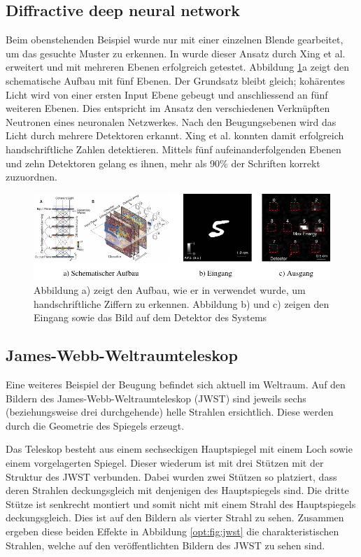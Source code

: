 \subsection{Diffractive deep neural network}
Beim obenstehenden Beispiel wurde nur mit einer einzelnen Blende gearbeitet, um das gesuchte Muster zu erkennen.
In \cite{opt:Lin.2018} wurde dieser Ansatz durch Xing et al. erweitert und mit mehreren Ebenen erfolgreich getestet.
Abbildung \ref{opt:fig:handwriting}a zeigt den schematische Aufbau mit fünf Ebenen.
Der Grundsatz bleibt gleich; kohärentes Licht wird von einer ersten Input Ebene gebeugt und anschliessend an fünf weiteren Ebenen.
Dies entspricht im Ansatz den verschiedenen Verknüpften Neutronen eines neuronalen Netzwerkes.
Nach den Beugungsebenen wird das Licht durch mehrere Detektoren erkannt.
Xing et al. konnten damit erfolgreich handschriftliche Zahlen detektieren.
Mittels fünf aufeinanderfolgenden Ebenen und zehn Detektoren gelang es ihnen, mehr als 90\% der Schriften korrekt zuzuordnen.

\begin{figure}
    \centering
    \includegraphics[width=\textwidth]{papers/opt/images/handwriting.pdf}
    \caption{Abbildung a) zeigt den Aufbau, wie er in \cite{opt:Lin.2018} verwendet wurde, um handschriftliche Ziffern zu erkennen.
    Abbildung b) und c) zeigen den Eingang sowie das Bild auf dem Detektor des Systems}
    \label{opt:fig:handwriting}
\end{figure}

\subsection{James-Webb-Weltraumteleskop}
Eine weiteres Beispiel der Beugung befindet sich aktuell im Weltraum.
Auf den Bildern des James-Webb-Weltraumteleskop (JWST) sind jeweils sechs (beziehungsweise drei durchgehende) helle Strahlen ersichtlich.
Diese werden durch die Geometrie des Spiegels erzeugt.

Das Teleskop besteht aus einem sechseckigen Hauptspiegel mit einem Loch sowie einem vorgelagerten Spiegel.
Dieser wiederum ist mit drei Stützen mit der Struktur des JWST verbunden.
Dabei wurden zwei Stützen so platziert, dass deren Strahlen deckungsgleich mit denjenigen des Hauptspiegels sind.
Die dritte Stütze ist senkrecht montiert und somit nicht mit einem Strahl des Hauptspiegels deckungsgleich.
Dies ist auf den Bildern als vierter Strahl zu sehen.
Zusammen ergeben diese beiden Effekte in Abbildung \ref{opt:fig:jwst} die charakteristischen Strahlen, welche auf
den veröffentlichten Bildern des JWST zu sehen sind.

